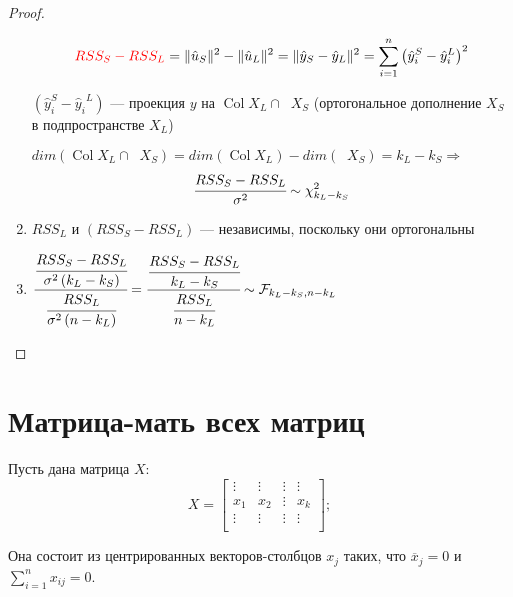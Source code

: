 \documentclass[12pt]{article} %
\theoremstyle{definition} %
\DeclareMathOperator{\Col}{Col}
\DeclareMathOperator{\Colp}{Col^{\perp}}
\def \s{\sigma}
\def \hy{\hat{y}}
\begin{document}
\begin{proof}
\begin{enumerate}
\begin{center}
        \[
        \textcolor{red}{\hbox{$RSS_S - RSS_L$}}
        = \lVert \hat u_S \rVert ^2 - \lVert \hat u_L \rVert ^2 
        = \lVert \hy_S - \hy_L \rVert ^2 
        = \sum_{i=1}^n \left(\hy_i^S - {\hy_i}^L \right)^2 \]\par
\end{center} 
        $(\hy_i^S - {\hy_i}^L)$  — проекция $y$ на $\Col X_L \cap \Colp X_S$ (ортогональное дополнение $X_S$ в подпространстве $X_L$)
    \par
        $dim(\Col X_L \cap \Colp X_S) = dim(\Col X_L) - dim(\Colp X_S) = k_L - k_S \Rightarrow$ 
    \[
        \cfrac{RSS_S-RSS_L}{\s^2}\sim \mathcal{\chi}_{k_L - k_S}^2
    \]
        \item $RSS_L \text{ и } (RSS_S - RSS_L)$ — независимы, поскольку они ортогональны
        \item $\cfrac{\cfrac{RSS_S - RSS_L}{\s^2\left(k_L - k_S\right)}}{{\cfrac{RSS_L}{\s^2\left(n-k_L\right)}}} = \cfrac{\cfrac{RSS_S - RSS_L}{k_L - k_S}}{{\cfrac{RSS_L}{n-k_L}}} \sim \mathcal{F}_{k_L-k_S, n-k_L}$
    \end{enumerate}
\end{proof}


\section{Матрица-мать всех матриц}
Пусть дана матрица $X$:
\[
X =  \begin{bmatrix}
           \vdots & \vdots & \vdots & \vdots \\
           x_1 & x_2 & \vdots & x_k \\
           \vdots & \vdots & \vdots & \vdots \\
         \end{bmatrix}
         ;
\]

Она состоит из центрированных векторов-столбцов $x_j$ таких, что $\overline{x}_j = 0$ и $\sum_{i=1}^n x_{ij} = 0$.
\end{document}
